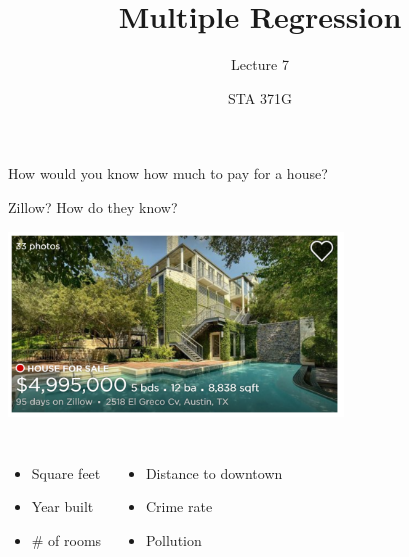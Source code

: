 \documentclass{beamer}\usepackage[]{graphicx}\usepackage[]{color}
\title{Multiple Regression}
\subtitle{Lecture 7}
\author{STA 371G}
\begin{document}
  
  
  

  \frame{\maketitle}



  \begin{darkframes}
  
  
    \begin{frame}
      How would you know how much to pay for a house? \pause
      
      Zillow? How do they know? 
      
      \begin{center}
        \includegraphics[width=3.5in]{zillow} \\
      \end{center} \pause
      
      \begin{columns}[onlytextwidth]
          \begin{itemize}
            \item Square feet
            \item Year built
            \item \# of rooms
          \end{itemize}
          \begin{itemize}
            \item Distance to downtown
            \item Crime rate
            \item Pollution
          \end{itemize}
      \end{columns}
      

\end{frame}
\end{darkframes}
\end{document}
